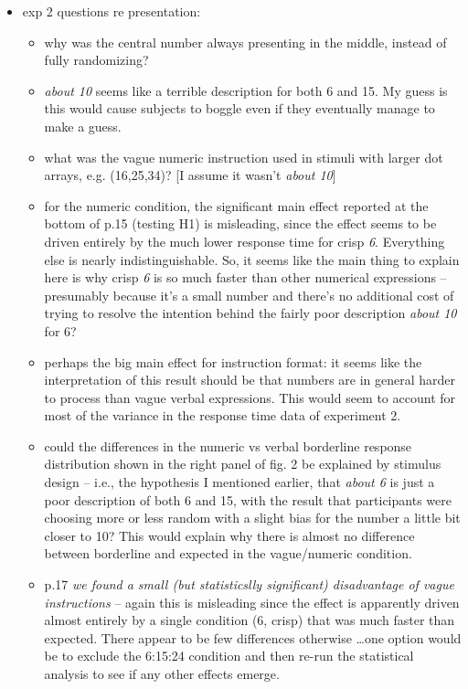 \documentclass[10pt,a4paper]{article}
\begin{document}
\begin{itemize}
\item
exp 2 questions re presentation: 
\begin{itemize}
\item
why was the central number always presenting in the middle, instead of fully randomizing?
\item
\emph{about 10} seems like a terrible description for both 6 and 15. My guess is this would cause subjects to boggle even if they eventually manage to make a guess.
\item
what was the vague numeric instruction used in stimuli with larger dot arrays, e.g. (16,25,34)? [I assume it wasn't \emph{about 10}]
\item
for the numeric condition, the significant main effect reported at the bottom of p.15 (testing H1) is misleading, since the effect seems to be driven entirely by the much lower response time for crisp \emph{6}. Everything else is nearly indistinguishable. So, it seems like the main thing to explain here is why crisp \emph{6} is so much faster than other numerical expressions – presumably because it's a small number and there's no additional cost of trying to resolve the intention behind the fairly poor description \emph{about 10} for 6?
\item
perhaps the big main effect for instruction format: it seems like the interpretation of this result should be that numbers are in general harder to process than vague verbal expressions. This would seem to account for most of the variance in the response time data of experiment 2.
\item
could the differences in the numeric vs verbal borderline response distribution shown in the right panel of fig. 2 be explained by stimulus design – i.e., the hypothesis I mentioned earlier, that \emph{about 6} is just a poor description of both 6 and 15, with the result that participants were choosing more or less random with a slight bias for the number a little bit closer to 10? This would explain why there is almost no difference between borderline and expected in the vague/numeric condition.
\item
p.17 \emph{we found a small (but statisticslly significant) disadvantage of vague instructions} – again this is misleading since the effect is apparently driven almost entirely by a single condition (6, crisp) that was much faster than expected. There appear to be few differences otherwise \ldots one option would be to exclude the 6:15:24 condition and then re-run the statistical analysis to see if any other effects emerge.

\end{itemize}
\end{itemize}
\end{document}
